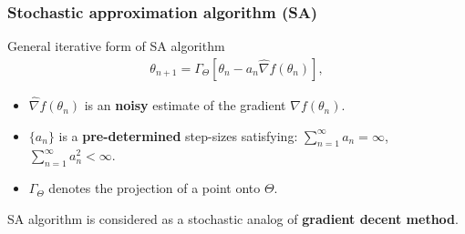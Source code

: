 \begin{frame}
\begin{small}
\frametitle{\centering  Stochastic approximation algorithm (SA)}
\begin{block}{General iterative form of SA algorithm}
\begin{align}\label{saalg}
\theta_{n+1} = \Gamma_{\Theta} \left [\theta_{n} - a_{n} \widehat{\nabla} f(\theta_{n}) \right],
\end{align}

\begin{itemize}
\item $ \widehat{\nabla} f(\theta_{n})$ is an \textbf{noisy} estimate of the gradient $ {\nabla} f(\theta_{n})$.
\item $\{a_{n}\}$ is a  \textbf{pre-determined} step-sizes satisfying: $\sum_{n=1}^{\infty} a_{n}  = \infty$,  $\sum_{n = 1}^{\infty} a_{n}^{2} < \infty$.
\item $\Gamma_{\Theta}$ denotes the projection of a point  onto $\Theta$.
\end{itemize}
\end{block}
\begin{block}{}
SA algorithm is considered  as a stochastic analog of \textbf{gradient decent method}.
\end{block}
\end{small}
\end{frame}


